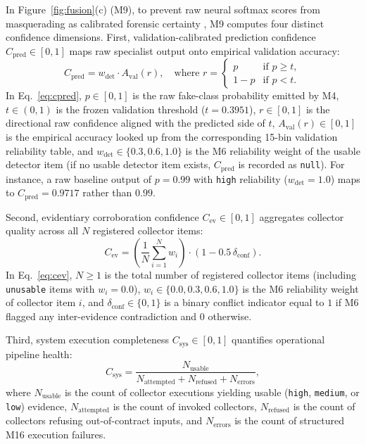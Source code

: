 \documentclass[final,5p,times,twocolumn,numafflabel]{elsarticle}
\begin{document}
In Figure~\ref{fig:fusion}(c) (M9), to prevent raw neural softmax scores from masquerading as calibrated forensic certainty \cite{Jin_2025}, M9 computes four distinct confidence dimensions. First, validation-calibrated prediction confidence $C_{\text{pred}} \in [0, 1]$ maps raw specialist output onto empirical validation accuracy:
\begin{equation}
  C_{\text{pred}} = w_{\text{det}} \cdot A_{\text{val}}(r), \quad \text{where } r = \begin{cases} p & \text{if } p \ge t, \\ 1 - p & \text{if } p < t. \end{cases}
  \label{eq:cpred}
\end{equation}
In Eq.~\eqref{eq:cpred}, $p \in [0, 1]$ is the raw fake-class probability emitted by M4, $t \in (0, 1)$ is the frozen validation threshold ($t = 0.3951$), $r \in [0, 1]$ is the directional raw confidence aligned with the predicted side of $t$, $A_{\text{val}}(r) \in [0, 1]$ is the empirical accuracy looked up from the corresponding 15-bin validation reliability table, and $w_{\text{det}} \in \{0.3, 0.6, 1.0\}$ is the M6 reliability weight of the usable detector item (if no usable detector item exists, $C_{\text{pred}}$ is recorded as \texttt{null}). For instance, a raw baseline output of $p = 0.99$ with \texttt{high} reliability ($w_{\text{det}} = 1.0$) maps to $C_{\text{pred}} = 0.9717$ rather than $0.99$.

Second, evidentiary corroboration confidence $C_{\text{ev}} \in [0, 1]$ aggregates collector quality across all $N$ registered collector items:
\begin{equation}
  C_{\text{ev}} = \left(\frac{1}{N} \sum_{i=1}^{N} w_i\right) \cdot (1 - 0.5\,\delta_{\text{conf}}).
  \label{eq:cev}
\end{equation}
In Eq.~\eqref{eq:cev}, $N \ge 1$ is the total number of registered collector items (including \texttt{unusable} items with $w_i = 0.0$), $w_i \in \{0.0, 0.3, 0.6, 1.0\}$ is the M6 reliability weight of collector item $i$, and $\delta_{\text{conf}} \in \{0, 1\}$ is a binary conflict indicator equal to $1$ if M6 flagged any inter-evidence contradiction and $0$ otherwise.

Third, system execution completeness $C_{\text{sys}} \in [0, 1]$ quantifies operational pipeline health:
\begin{equation}
  C_{\text{sys}} = \frac{N_{\text{usable}}}{N_{\text{attempted}} + N_{\text{refused}} + N_{\text{errors}}},
  \label{eq:csys}
\end{equation}
where $N_{\text{usable}}$ is the count of collector executions yielding usable (\texttt{high}, \texttt{medium}, or \texttt{low}) evidence, $N_{\text{attempted}}$ is the count of invoked collectors, $N_{\text{refused}}$ is the count of collectors refusing out-of-contract inputs, and $N_{\text{errors}}$ is the count of structured M16 execution failures.
\end{document}
